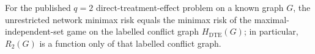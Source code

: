 For the published \(q=2\) direct-treatment-effect problem on a known graph \(G\), the unrestricted network minimax risk equals the minimax risk of the maximal-independent-set game on the labelled conflict graph \(H_{\mathrm{DTE}}(G)\); in particular, \(R_2(G)\) is a function only of that labelled conflict graph.